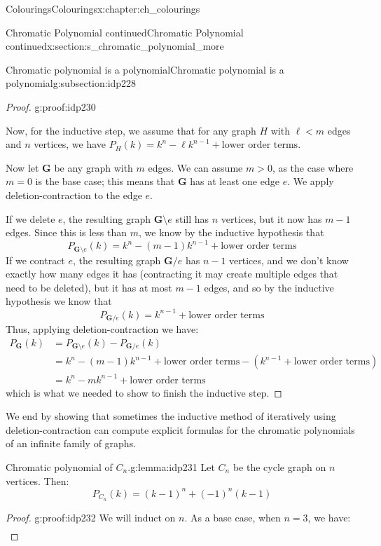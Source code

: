\documentclass[oneside,10pt,]{book}
\numberwithin{equation}{section}
\newcommand{\bfG}{\mathbf{G}}
\newcommand{\lt}{<}
\newcommand{\gt}{>}
\newcommand{\amp}{&}
\begin{document}
\begin{chapterptx}{Colourings}{}{Colourings}{}{}{x:chapter:ch_colourings}
\begin{sectionptx}{Chromatic Polynomial continued}{}{Chromatic Polynomial continued}{}{}{x:section:s_chromatic_polynomial_more}
\begin{subsectionptx}{Chromatic polynomial is a polynomial}{}{Chromatic polynomial is a polynomial}{}{}{g:subsection:idp228}
\begin{proof}{}{g:proof:idp230}
\par
Now, for the inductive step, we assume that for any graph \(H\) with \(\ell\lt m\) edges and \(n\) vertices, we have \(P_{H}(k)=k^n-\ell k^{n-1}+\text{lower order terms}\).%
\par
Now let \(\bfG\) be any graph with \(m\) edges.  We can assume \(m\gt 0\), as the case where \(m=0\) is the base case; this means that \(\bfG\) has at least one edge \(e\).  We apply deletion-contraction to the edge \(e\).%
\par
If we delete \(e\), the resulting graph \(\bfG\setminus e\) still has \(n\) vertices, but it now has \(m-1\) edges.  Since this is less than \(m\), we know by the inductive hypothesis that%
%
\begin{equation*}
P_{\bfG\setminus e}(k)=k^n-(m-1)k^{n-1}+\text{lower order terms}
\end{equation*}
If we contract \(e\), the resulting graph \(\bfG/e\) has \(n-1\) vertices, and we don't know exactly how many edges it has (contracting it may create multiple edges that need to be deleted), but it has at most \(m-1\) edges, and so by the inductive hypothesis we know that%
%
\begin{equation*}
P_{\bfG/e}(k)=k^{n-1}+\text{lower order terms}
\end{equation*}
Thus, applying deletion-contraction we have:%
%
\begin{align*}
P_\bfG(k) \amp = P_{\bfG\setminus e}(k)-P_{\bfG/e}(k) \\
\amp = k^n-(m-1)k^{n-1}+\text{lower order terms} - \left(k^{n-1}+\text{lower order terms} \right)\\
\amp = k^n-mk^{n-1}+\text{lower order terms}
\end{align*}
which is what we needed to show to finish the inductive step.%
\end{proof}
We end by showing that sometimes the inductive method of iteratively using deletion-contraction can compute explicit formulas for the chromatic polynomials of an infinite family of graphs.%
\begin{lemma}{Chromatic polynomial of \(C_n\).}{}{g:lemma:idp231}%
Let \(C_n\) be the cycle graph on \(n\) vertices.  Then:%
%
\begin{equation*}
P_{C_n}(k) = (k-1)^n+(-1)^n(k-1)
\end{equation*}
\end{lemma}
\begin{proof}{}{g:proof:idp232}
We will induct on \(n\).  As a base case, when \(n=3\), we have:%
%
\begin{align*}

\end{align*}
\end{proof}
\end{subsectionptx}
\end{sectionptx}
\end{chapterptx}
\end{document}
